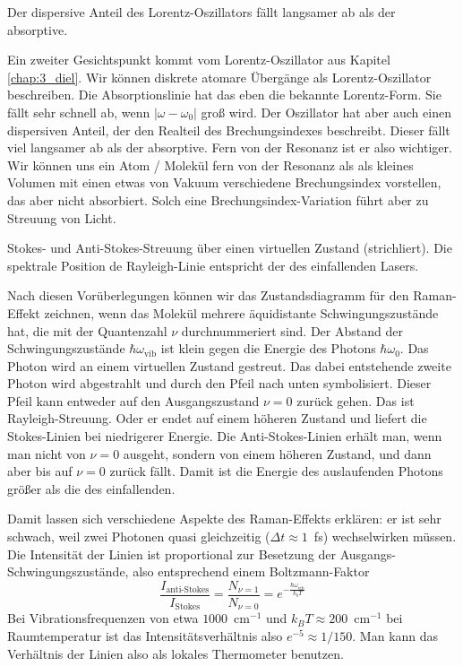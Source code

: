 \begin{marginfigure}
\caption{Der dispersive Anteil des Lorentz-Oszillators fällt langsamer ab als der absorptive. }
\end{marginfigure}
 

Ein zweiter Gesichtspunkt kommt vom Lorentz-Oszillator aus Kapitel \ref{chap:3_diel}. Wir können diskrete atomare Übergänge als Lorentz-Oszillator beschreiben. Die Absorptionslinie hat das eben die bekannte Lorentz-Form. Sie fällt sehr schnell ab, wenn $| \omega  - \omega_0 |$ groß wird. Der Oszillator hat aber auch einen dispersiven Anteil, der den Realteil des Brechungsindexes beschreibt. Dieser fällt viel langsamer ab als der absorptive. Fern von der Resonanz ist er also wichtiger. Wir können uns ein Atom / Molekül fern von der Resonanz als als kleines Volumen mit einen etwas von Vakuum verschiedene Brechungsindex vorstellen, das aber nicht absorbiert. Solch eine Brechungsindex-Variation führt aber zu Streuung von Licht.

\begin{marginfigure}%
\caption{Stokes- und Anti-Stokes-Streuung über einen virtuellen Zustand (strichliert). Die spektrale Position de Rayleigh-Linie entspricht der des einfallenden Lasers.}
\end{marginfigure}
 

Nach diesen Vorüberlegungen können wir das Zustandsdiagramm für den Raman-Effekt zeichnen, wenn das Molekül mehrere äquidistante Schwingungszustände hat, die mit der Quantenzahl $\nu$ durchnummeriert sind. Der Abstand der Schwingungszustände $\hbar \omega_\text{vib}$ ist klein gegen die Energie des Photons $\hbar \omega_0$. Das Photon wird an einem virtuellen Zustand gestreut. Das dabei entstehende zweite Photon wird abgestrahlt und durch den Pfeil nach unten symbolisiert. Dieser Pfeil kann entweder auf den Ausgangszustand $\nu = 0$ zurück gehen. Das ist Rayleigh-Streuung. Oder er endet auf einem höheren Zustand und liefert die Stokes-Linien bei niedrigerer Energie. Die Anti-Stokes-Linien erhält man, wenn man nicht von $\nu = 0$ ausgeht, sondern von einem höheren Zustand, und dann aber bis auf $\nu = 0$ zurück fällt. Damit ist die Energie des auslaufenden Photons größer als die des einfallenden.



Damit lassen sich verschiedene Aspekte des Raman-Effekts erklären: er ist sehr schwach, weil zwei Photonen quasi gleichzeitig ($\Delta t \approx 1$~fs) wechselwirken müssen. Die Intensität der Linien ist proportional zur Besetzung der Ausgangs-Schwingungszustände, also entsprechend einem Boltzmann-Faktor
\begin{equation}
\frac{I_\text{anti-Stokes}}{I_\text{Stokes}} = 
\frac{N_{\nu = 1}}{N_{\nu = 0}} =
 e^{- \frac{\hbar \omega_\text{vib}}{k_b T}}
\end{equation}
Bei Vibrationsfrequenzen von etwa $1000$~cm$^{-1}$ und $k_B T \approx 200 $~cm$^{-1}$ bei Raumtemperatur ist das Intensitätsverhältnis also $e^{-5} \approx 1 /150$. Man kann das Verhältnis der Linien also als lokales Thermometer benutzen.


